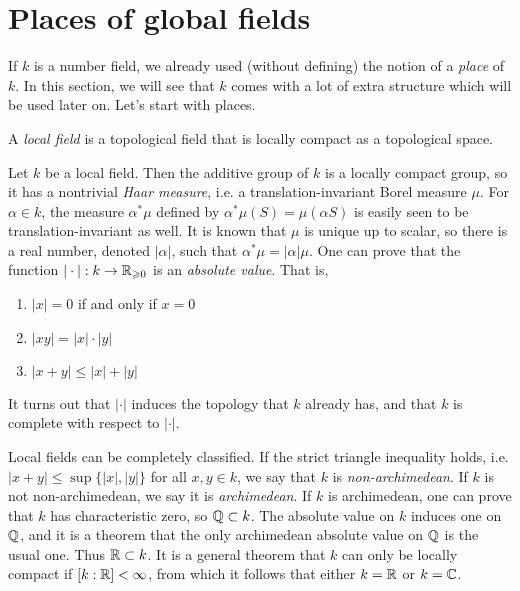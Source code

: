 \documentclass{article}
\begin{document}
\section{Places of global fields}

If $k$ is a number field, we already used (without defining) the notion of a 
\emph{place} of $k$. In this section, we will see that $k$ comes with a lot of 
extra structure which will be used later on. Let's start with places. 

\begin{definition}
A \emph{local field} is a topological field that is locally compact as a 
topological space. 
\end{definition}

Let $k$ be a local field. Then the additive group of $k$ is a locally compact 
group, so it has a nontrivial \emph{Haar measure}, i.e. a 
translation-invariant Borel measure $\mu$. For $\alpha\in k$, the measure 
$\alpha^*\mu$ defined by $\alpha^* \mu(S) = \mu(\alpha S)$ is easily seen to 
be translation-invariant as well. It is known that $\mu$ is unique up to 
scalar, so there is a real number, denoted $|\alpha|$, such that 
$\alpha^*\mu = |\alpha|\mu$. One can prove that the function 
$|\cdot|:k\to \mathbb{R}_{\geqslant 0}$ is an \emph{absolute value}. That is, 
\begin{enumerate}
  \item $|x|=0$ if and only if $x=0$
  \item $|x y| = |x|\cdot |y|$
  \item $|x+y|\leqslant |x|+|y|$
\end{enumerate}
It turns out that $|\cdot|$ induces the topology that $k$ already has, and 
that $k$ is complete with respect to $|\cdot|$. 

Local fields can be completely classified. If the strict triangle inequality 
holds, i.e. $|x+y|\leqslant \sup\{|x|,|y|\}$ for all $x,y\in k$, we say that 
$k$ is \emph{non-archimedean}. If $k$ is not non-archimedean, we say it is 
\emph{archimedean}. If $k$ is archimedean, one can prove that $k$ has 
characteristic zero, so $\mathbb{Q}\subset k$. The absolute value on $k$ induces one 
on $\mathbb{Q}$, and it is a theorem that the only archimedean absolute value on 
$\mathbb{Q}$ is the usual one. Thus $\mathbb{R}\subset k$. It is a general theorem that $k$ 
can only be locally compact if $[k:\mathbb{R}]<\infty$, from which it follows that 
either $k=\mathbb{R}$ or $k=\mathbb{C}$. 
\end{document}
